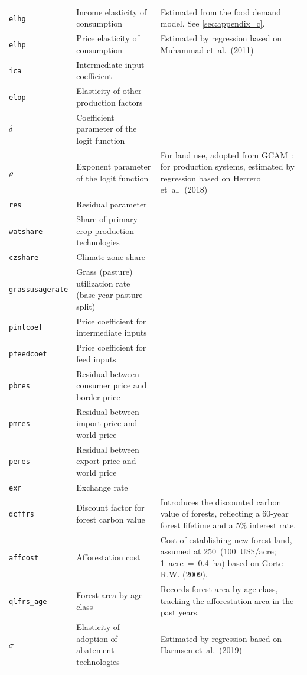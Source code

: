 \begin{xltabular}{\linewidth}{l X X}
  \texttt{elhg} & Income elasticity of consumption & Estimated from the food demand model. See \cref{sec:appendix_c}. \\
  \texttt{elhp} & Price elasticity of consumption & Estimated by regression based on Muhammad et~al.~(2011) \\
  \texttt{ica} & Intermediate input coefficient & \\
  \texttt{elop} & Elasticity of other production factors & \\
  $\delta$ & Coefficient parameter of the logit function & \\
  $\rho$ & Exponent parameter of the logit function & For land use, adopted from GCAM~\cite{calvinGCAMV51Representing2019}; for production systems, estimated by regression based on Herrero et~al.~(2018) \\
  \texttt{res} & Residual parameter & \\
  \texttt{watshare} & Share of primary-crop production technologies & \\
  \texttt{czshare} & Climate zone share & \\
  \texttt{grassusagerate} & Grass (pasture) utilization rate (base-year pasture split) & \\
  \texttt{pintcoef} & Price coefficient for intermediate inputs & \\
  \texttt{pfeedcoef} & Price coefficient for feed inputs & \\
  \texttt{pbres} & Residual between consumer price and border price & \\
  \texttt{pmres} & Residual between import price and world price & \\
  \texttt{peres} & Residual between export price and world price & \\
  \texttt{exr} & Exchange rate & \\
  \texttt{dcffrs} & Discount factor for forest carbon value & Introduces the discounted carbon value of forests, reflecting a 60-year forest lifetime and a 5\% interest rate. \\
  \texttt{affcost} & Afforestation cost & Cost of establishing new forest land, assumed at 250~(100~US\$/acre; 1~acre~=~0.4~ha) based on Gorte R.W. (2009). \\
  \texttt{qlfrs\_age} & Forest area by age class & Records forest area by age class, tracking the afforestation area in the past years.\\
  $\sigma$ & Elasticity of adoption of abatement technologies & Estimated by regression based on Harmsen et~al.~(2019) \\
\end{xltabular}
